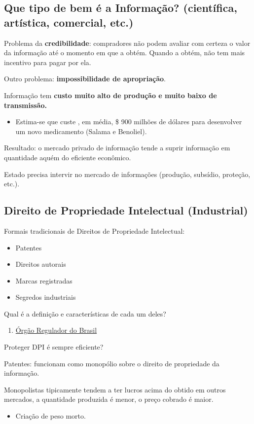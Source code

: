\documentclass[a4paper,12pt]{article}[abntex2]
\begin{document}
\subsection{\textbf{Que tipo de bem é a Informação? (científica, artística, comercial, etc.)}}
Problema da \textbf{credibilidade}: compradores não podem avaliar com certeza o valor da informação até o momento em que a obtém. Quando a obtém, não tem mais incentivo para pagar por ela.

Outro problema: \textbf{impossibilidade de apropriação}.

Informação tem \textbf{custo muito alto de produção e muito baixo de transmissão. } \begin{itemize}
    \item Estima-se que custe , em média, \$ 900 milhões de dólares para desenvolver um novo medicamento (Salama e Benoliel).
\end{itemize}

Resultado: o mercado privado de informação tende a suprir informação em quantidade aquém do eficiente econômico. 

Estado precisa intervir no mercado de informações (produção, subsídio, proteção, etc.). 

\subsection{\textbf{Direito de Propriedade Intelectual (Industrial)}}
Formais tradicionais de Direitos de Propriedade Intelectual:\begin{itemize}
    \item Patentes
    \item Direitos autorais
    \item Marcas registradas
    \item Segredos industriais
\end{itemize}

Qual é a definição e características de cada um deles?\begin{enumerate}
    \item \href{https://www.gov.br/inpi/pt-br}{Órgão Regulador do Brasil}
\end{enumerate}

Proteger DPI é sempre eficiente?

Patentes: funcionam como monopólio sobre o direito de propriedade da informação. 

Monopolistas tipicamente tendem a ter lucros acima do obtido em outros mercados, a quantidade produzida é menor, o preço cobrado é maior. \begin{itemize}
    \item Criação de peso morto.
\end{itemize}
\end{document}
